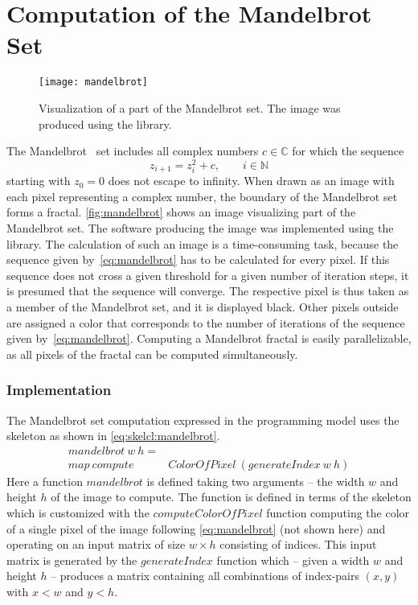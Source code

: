 \section{Computation of the Mandelbrot Set}

\begin{figure}[tb]
  \centering
  \texttt{[image: mandelbrot]}
  \caption[Visualization of a part of the Mandelbrot set.]%
          {Visualization of a part of the Mandelbrot set. The image was produced using the \SkelCL library.}
  \label{fig:mandelbrot}
\end{figure}

The Mandelbrot~\cite{Mandelbrot1980} set includes all complex numbers $c \in {\mathbb C}$ for which the sequence
\begin{equation}
	z_{i+1} = z_{i}^{2} + c,\qquad i\in {\mathbb N}
	\label{eq:mandelbrot}
\end{equation}
starting with $z_{0}=0$ does not escape to infinity.
When drawn as an image with each pixel representing a complex number, the boundary of the Mandelbrot set forms a fractal.
\autoref{fig:mandelbrot} shows an image visualizing part of the Mandelbrot set.
The software producing the image was implemented using the \SkelCL library. 
The calculation of such an image is a time-consuming task, because the sequence given by~\autoref{eq:mandelbrot} has to be calculated for every pixel.
If this sequence does not cross a given threshold for a given number of iteration steps, it is presumed that the sequence will converge.
The respective pixel is thus taken as a member of the Mandelbrot set, and it is displayed black.
Other pixels outside are assigned a color that corresponds to the number of iterations of the sequence given by~\autoref{eq:mandelbrot}.
Computing a Mandelbrot fractal is easily parallelizable, as all pixels of the fractal can be computed simultaneously.

\subsubsection*{\SkelCL Implementation}
\label{sec:mandelbrot:implementation}
The Mandelbrot set computation expressed in the \SkelCL programming model uses the \map skeleton as shown in \autoref{eq:skelcl:mandelbrot}.
\begin{align}
  mandelbrot\ w\ h =&  \nonumber\\
         map\ compute&ColorOfPixel\ (generateIndex\ w\ h)
  \label{eq:skelcl:mandelbrot}
\end{align}
Here a function $mandelbrot$ is defined taking two arguments -- the width $w$ and height $h$ of the image to compute.
The function is defined in terms of the \map skeleton which is customized with the $computeColorOfPixel$ function computing the color of a single pixel of the image following \autoref{eq:mandelbrot} (not shown here) and operating on an input matrix of size $w\times h$ consisting of indices.
This input matrix is generated by the $generateIndex$ function which -- given a width $w$ and height $h$ -- produces a matrix containing all combinations of index-pairs $(x,y)$ with $x < w$ and $y < h$.

